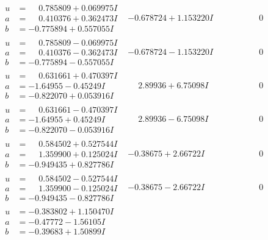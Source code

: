 \documentclass[1p]{elsarticle_modified}
\theoremstyle{definition}
\begin{document}
$$\begin{array}{c|c|c}
\begin{aligned}
u &= \phantom{-}0.785809 + 0.069975 I \\
a &= \phantom{-}0.410376 + 0.362473 I \\
b &= -0.775894 + 0.557055 I\end{aligned}
 & -0.678724 + 1.153220 I & \phantom{-0.000000 } 0 \\ \hline\begin{aligned}
u &= \phantom{-}0.785809 - 0.069975 I \\
a &= \phantom{-}0.410376 - 0.362473 I \\
b &= -0.775894 - 0.557055 I\end{aligned}
 & -0.678724 - 1.153220 I & \phantom{-0.000000 } 0 \\ \hline\begin{aligned}
u &= \phantom{-}0.631661 + 0.470397 I \\
a &= -1.64955 - 0.45249 I \\
b &= -0.822070 + 0.053916 I\end{aligned}
 & \phantom{-}2.89936 + 6.75098 I & \phantom{-0.000000 } 0 \\ \hline\begin{aligned}
u &= \phantom{-}0.631661 - 0.470397 I \\
a &= -1.64955 + 0.45249 I \\
b &= -0.822070 - 0.053916 I\end{aligned}
 & \phantom{-}2.89936 - 6.75098 I & \phantom{-0.000000 } 0 \\ \hline\begin{aligned}
u &= \phantom{-}0.584502 + 0.527544 I \\
a &= \phantom{-}1.359900 + 0.125024 I \\
b &= -0.949435 + 0.827786 I\end{aligned}
 & -0.38675 + 2.66722 I & \phantom{-0.000000 } 0 \\ \hline\begin{aligned}
u &= \phantom{-}0.584502 - 0.527544 I \\
a &= \phantom{-}1.359900 - 0.125024 I \\
b &= -0.949435 - 0.827786 I\end{aligned}
 & -0.38675 - 2.66722 I & \phantom{-0.000000 } 0 \\ \hline\begin{aligned}
u &= -0.383802 + 1.150470 I \\
a &= -0.47772 - 1.56105 I \\
b &= -0.39683 + 1.50899 I\end{aligned}

\end{array}$$
\end{document}
